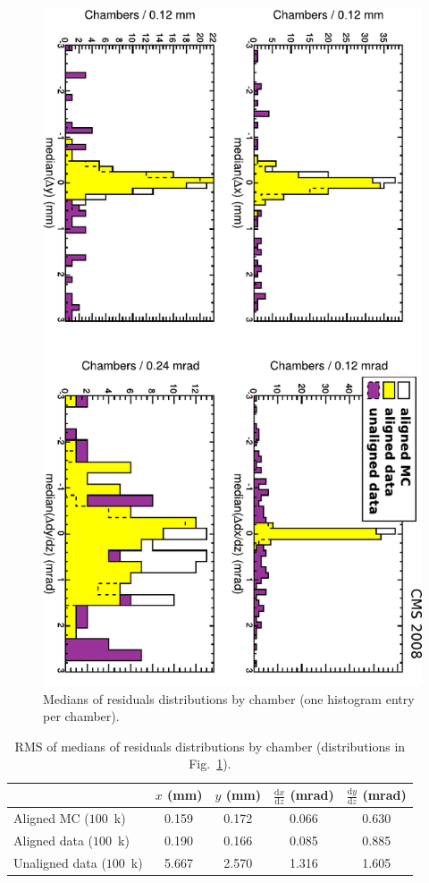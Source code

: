\begin{figure}[p]
\centering
\includegraphics[height=0.9\linewidth, angle=90]{plots/gma_hip_results/statscheck_medians.pdf}
\caption{Medians of residuals distributions by chamber (one histogram
entry per chamber). \label{fig:residuals_mean}}
\end{figure}

\begin{table}[p]
\caption{RMS of medians of residuals distributions by chamber (distributions in Fig.~\ref{fig:residuals_mean}).} \label{tab:residuals_mean}

\vspace{-0.5 cm}
\begin{center}
\renewcommand{\arraystretch}{1.5}
\begin{tabular}{l | c c c c}
\hline\hline & \hspace{0.3 cm}$x$ (mm)\hspace{0.3 cm} & \hspace{0.3 cm}$y$ (mm)\hspace{0.3 cm} & \hspace{0.3 cm}$\frac{\textrm{d}x}{\textrm{d}z}$ (mrad)\hspace{0.3 cm} & \hspace{0.3 cm}$\frac{\textrm{d}y}{\textrm{d}z}$ (mrad)\hspace{0.3 cm} \\\hline
Aligned MC ($100$~k) & 0.159 & 0.172 & 0.066 & 0.630 \\
Aligned data ($100$~k) & 0.190 & 0.166 & 0.085 & 0.885 \\\hline
Unaligned data ($100$~k) & 5.667 & 2.570 & 1.316 & 1.605 \\\hline\hline
\end{tabular}
\end{center}
\end{table}

